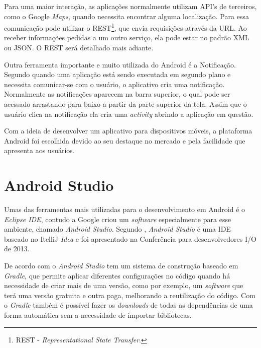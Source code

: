 	\par Para uma maior interação, as aplicações normalmente utilizam API’s de
terceiros, como o Google \textit{Maps}, quando necessita encontrar alguma
localização. Para  essa comunicação pode utilizar o
REST\footnote{REST - \textit{Representational State Transfer}.}, que envia
requisições através da URL. Ao receber informações pedidas a um outro serviço,
ela pode estar no padrão XML ou JSON. O REST será detalhado mais adiante.

	\par Outra ferramenta importante e muito utilizada do Android é a Notificação.
Segundo  quando uma aplicação está sendo executada em
segundo plano e necessita comunicar-se com o usuário, o aplicativo cria uma
notificação. Normalmente as notificações aparecem na barra superior, o qual
pode ser acessado arrastando para baixo a partir da parte superior da tela.
Assim que o usuário clica na notificação ela cria uma \textit{activity} abrindo
a aplicação em questão.

	\par Com a ideia de desenvolver um aplicativo para dispositivos móveis, a
plataforma Android foi escolhida devido ao seu destaque no mercado e pela
facilidade que apresenta aos usuários.

\section{Android Studio}

	\par Umas das ferramentas mais utilizadas para o desenvolvimento em Android é o
\textit{Eclipse IDE}, contudo a Google criou um \textit{software} especialmente
para esse ambiente, chamado \textit{Android Studio}. Segundo
, \textit{Android Studio} é uma IDE baseado no ItelliJ
\textit{Idea} e foi apresentado na Conferência para desenvolvedores I/O de 2013.

	\par De acordo com  o \textit{Android Studio} tem um
sistema de construção baseado em \textit{Gradle}, que permite aplicar
diferentes configurações no código quando há necessidade de criar mais de uma
versão, como por exemplo, um \textit{software} que terá uma versão gratuita e
outra paga, melhorando a reutilização do código. Com o \textit{Gradle} também é
possível fazer os \textit{downloads} de todas as dependências de uma forma
automática sem a necessidade de importar bibliotecas.

